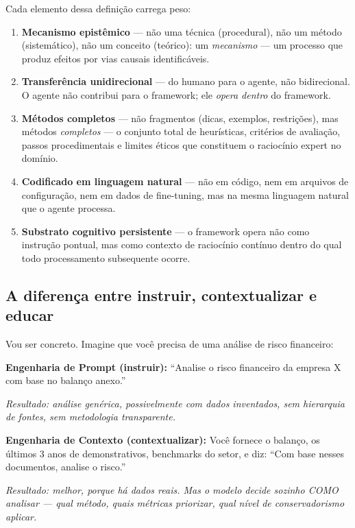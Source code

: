 \documentclass[12pt,a4paper]{article}
\begin{document}
Cada elemento dessa definição carrega peso:

\begin{enumerate}
  \item \textbf{Mecanismo epistêmico} --- não uma técnica (procedural), não um método (sistemático), não um conceito (teórico): um \emph{mecanismo} --- um processo que produz efeitos por vias causais identificáveis.
  \item \textbf{Transferência unidirecional} --- do humano para o agente, não bidirecional. O agente não contribui para o framework; ele \emph{opera dentro} do framework.
  \item \textbf{Métodos completos} --- não fragmentos (dicas, exemplos, restrições), mas métodos \emph{completos} --- o conjunto total de heurísticas, critérios de avaliação, passos procedimentais e limites éticos que constituem o raciocínio expert no domínio.
  \item \textbf{Codificado em linguagem natural} --- não em código, nem em arquivos de configuração, nem em dados de fine-tuning, mas na mesma linguagem natural que o agente processa.
  \item \textbf{Substrato cognitivo persistente} --- o framework opera não como instrução pontual, mas como contexto de raciocínio contínuo dentro do qual todo processamento subsequente ocorre.
\end{enumerate}

\subsection{A diferença entre instruir, contextualizar e educar}

Vou ser concreto. Imagine que você precisa de uma análise de risco financeiro:

\textbf{Engenharia de Prompt (instruir):} ``Analise o risco financeiro da empresa X com base no balanço anexo.''

\emph{Resultado: análise genérica, possivelmente com dados inventados, sem hierarquia de fontes, sem metodologia transparente.}

\textbf{Engenharia de Contexto (contextualizar):} Você fornece o balanço, os últimos 3 anos de demonstrativos, benchmarks do setor, e diz: ``Com base nesses documentos, analise o risco.''

\emph{Resultado: melhor, porque há dados reais. Mas o modelo decide sozinho COMO analisar --- qual método, quais métricas priorizar, qual nível de conservadorismo aplicar.}
\end{document}

